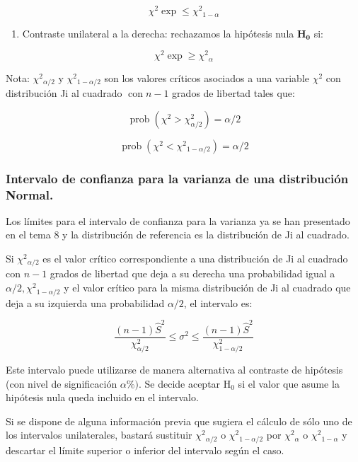 \documentclass[
]{article}
\providecommand{\tightlist}{%
  \setlength{\itemsep}{0pt}\setlength{\parskip}{0pt}}
\begin{document}
\[
\chi^{2} \exp \leq \chi^{2}{ }_{1-\alpha}
\]

\begin{enumerate}
\def\labelenumi{\alph{enumi})}
\setcounter{enumi}{2}
\tightlist
\item
  Contraste unilateral a la derecha: rechazamos la hipótesis nula \(\mathbf{H}_{\mathbf{0}}\) si:
\end{enumerate}

\[
\chi^{2} \exp \geq \chi^{2}{ }_{\alpha}
\]

Nota: \(\chi^{2}{ }_{\alpha / 2}\) y \(\chi^{2}{ }_{1-\alpha / 2}\) son los valores críticos asociados a una variable \(\chi^{2}\) con distribución Ji al cuadrado \(\operatorname{con} n-1\) grados de libertad tales que:

\[
\operatorname{prob}\left(\chi^{2}>\chi_{\alpha / 2}^{2}\right)=\alpha / 2
\]

\[
\operatorname{prob}\left(\chi^{2}<\chi^{2}{ }_{1-\alpha / 2}\right)=\alpha / 2
\]

\subsubsection{Intervalo de confianza para la varianza de una distribución Normal.}\label{intervalo-de-confianza-para-la-varianza-de-una-distribuciuxf3n-normal.}

Los límites para el intervalo de confianza para la varianza ya se han presentado en el tema 8 y la distribución de referencia es la distribución de Ji al cuadrado.

Si \(\chi^{2}{ }_{\alpha / 2}\) es el valor crítico correspondiente a una distribución de Ji al cuadrado con \(n-1\) grados de libertad que deja a su derecha una probabilidad igual a \(\alpha / 2, \chi^{2}{ }_{1-\alpha / 2}\) y el valor crítico para la misma distribución de Ji al cuadrado que deja a su izquierda una probabilidad \(\alpha / 2\), el intervalo es:

\[
\frac{(n-1) \hat{S}^{2}}{\chi_{\alpha / 2}^{2}} \leq \sigma^{2} \leq \frac{(n-1) \hat{S}^{2}}{\chi_{1-\alpha / 2}^{2}}
\]

Este intervalo puede utilizarse de manera alternativa al contraste de hipótesis (con nivel de significación \(\alpha \%)\). Se decide aceptar \(\mathrm{H}_{0}\) si el valor que asume la hipótesis nula queda incluido en el intervalo.

Si se dispone de alguna información previa que sugiera el cálculo de sólo uno de los intervalos unilaterales, bastará sustituir \(\chi^{2}{ }_{\alpha / 2}\) o \(\chi^{2}{ }_{1-\alpha / 2}\) por \(\chi^{2}{ }_{\alpha}\) o \(\chi^{2}{ }_{1-\alpha}\) y descartar el límite superior o inferior del intervalo según el caso.
\end{document}
